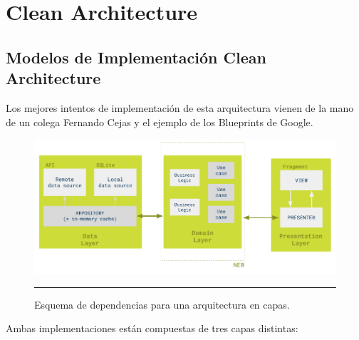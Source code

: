 
\chapter{Clean Architecture} %

\label{Chapter5} %



\section{Modelos de Implementación Clean Architecture}

Los mejores intentos de implementación de esta arquitectura vienen de la mano de un colega Fernando Cejas y el ejemplo de los Blueprints de Google.

\begin{figure}[htbp]
	\centering
	\includegraphics[width=1\textwidth]{Figures/-006.png}
	\rule{35em}{1pt}
	\caption[Principio de Dependecias]{Esquema de dependencias para una arquitectura en capas.}
	\label{fig:Diagrama_clasico}
\end{figure}

Ambas implementaciones están compuestas de tres capas distintas:

